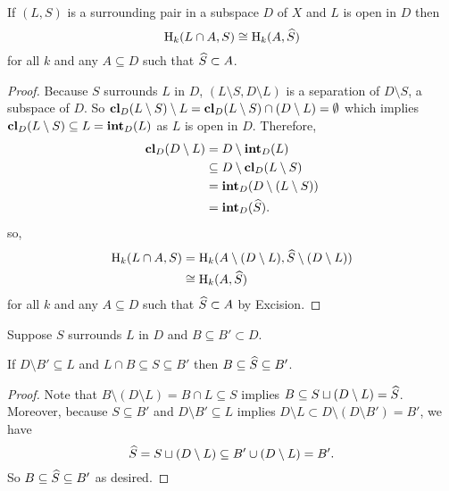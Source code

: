 \begin{lemma}\label{lem:excision}
  If $(L, S)$ is a surrounding pair in a subspace $D$ of $X$ and $L$ is open in $D$ then
  \[ \mathrm{H}_k(L\cap A, S) \cong \mathrm{H}_k(A, \widehat{S}) \]
  for all $k$ and any $A\subseteq D$ such that $\widehat{S}\subset A$.
\end{lemma}
\begin{proof}
  Because $S$ surrounds $L$ in $D$, $(L\setminus S, D\setminus L)$ is a separation of $D\setminus S$, a subspace of $D$.
  So $\mathbf{cl}_D(L\setminus S)\setminus L = \mathbf{cl}_D(L\setminus S) \cap (D\setminus L) = \emptyset$ which implies $\mathbf{cl}_D(L\setminus S)\subseteq L = \mathbf{int}_D(L)$ as $L$ is open in $D$.
  Therefore,
  \begin{align*}
    \mathbf{cl}_D(D\setminus L) &= D\setminus \mathbf{int}_D(L)\\
                        &\subseteq D\setminus \mathbf{cl}_D(L\setminus S)\\
                        &= \mathbf{int}_D(D\setminus (L\setminus S))\\
                        &= \mathbf{int}_D(\widehat{S}).
  \end{align*}
  so,
  \begin{align*}
    \mathrm{H}_k(L\cap A, S) &= \mathrm{H}_k(A\setminus (D\setminus L), \widehat{S}\setminus (D\setminus L))\\
      &\cong \mathrm{H}_k(A, \widehat{S})
  \end{align*}
  for all $k$ and any $A\subseteq D$ such that $\widehat{S}\subset A$ by Excision.
\end{proof}

\begin{lemma}\label{lem:surround_and_cover}
  Suppose $S$ surrounds $L$ in $D$ and $B\subseteq B'\subset D$.

  If $D\setminus B'\subseteq L$ and $L\cap B\subseteq S\subseteq B'$ then $B\subseteq \widehat{S}\subseteq B'$.
\end{lemma}
\begin{proof}
  Note that $B\setminus (D\setminus L) = B\cap L\subseteq S$ implies $B\subseteq S\sqcup(D\setminus L) = \widehat{S}$.
  Moreover, because $S\subseteq B'$ and $D\setminus B'\subseteq L$ implies $D\setminus L \subset D\setminus (D\setminus B') = B'$, we have
  \[ \widehat{S} = S\sqcup (D\setminus L) \subseteq B'\cup (D\setminus L) = B'. \]
  So $B \subseteq \widehat{S}\subseteq B'$ as desired.
\end{proof}

